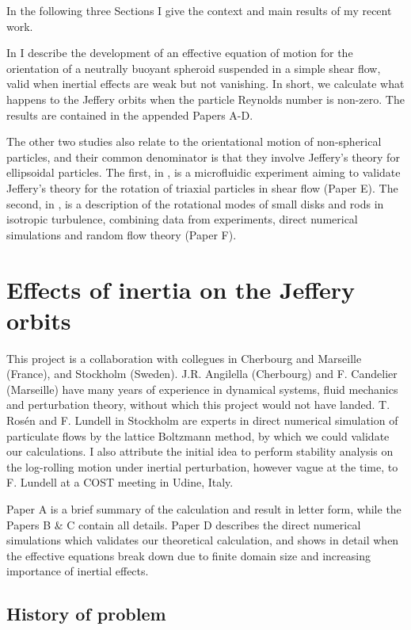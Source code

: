 \documentclass[thesis.tex]{subfiles}
\begin{document}
In the following three Sections I give the context and main results of my recent work. 

In  I describe the development of an effective equation of motion for the orientation of a neutrally buoyant spheroid suspended in a simple shear flow, valid when inertial effects are weak but not vanishing. In short, we calculate what happens to the Jeffery orbits when the particle Reynolds number is non-zero. The results are contained in the appended Papers A-D.

The other two studies also relate to the orientational motion of non-spherical particles, and their common denominator is that they involve Jeffery's theory for ellipsoidal particles.
The first, in , is a microfluidic experiment aiming to validate Jeffery's theory for the rotation of triaxial particles in shear flow (Paper E). The second, in , is a description of the rotational modes of small disks and rods in isotropic turbulence, combining data from experiments, direct numerical simulations and random flow theory (Paper F).

\chapter[Effects of inertia]{Effects of inertia on the Jeffery orbits}\label{sec:effective}

This project is a collaboration with collegues in Cherbourg and Marseille (France), and Stockholm (Sweden). J.R. Angilella (Cherbourg) and F. Candelier (Marseille) have many years of experience in dynamical systems, fluid mechanics and perturbation theory, without which this project would not have landed. T. Ros\'en and F. Lundell in Stockholm are experts in direct numerical simulation of particulate flows by the lattice Boltzmann method, by which we could validate our calculations. I also attribute the initial idea to perform stability analysis on the log-rolling motion under inertial perturbation, however vague at the time, to F. Lundell at a COST meeting in Udine, Italy. 

Paper A is a brief summary of the calculation and result in letter form, while the Papers B \& C contain all details. Paper D describes the direct numerical simulations which validates our theoretical calculation, and shows in detail when the effective equations break down due to finite domain size and increasing importance of inertial effects.

\section{History of problem}
\end{document}
